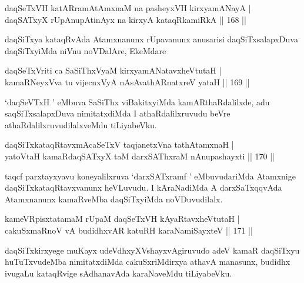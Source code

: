 \begin{shl}
daqSeTxVH katARramAtAmxnaM na pasheyxVH kirxyamANayA |\\
daqSATxyX rUpAnupAtinAyx na kirxyA kataqRkamiRkA \hfill || 168 ||
\end{shl}

\begin{artha}
daqSiTxya kataqRvAda Atamxnanunx rUpavanunx anusarisi daqSiTxsalapxDuva daqSiTxyiMda niVnu noVDalAre, EkeMdare
\end{artha}

\begin{shl}
daqSeTxVriti ca SaSiThxVyaM kirxyamANatavxheVtutaH |\\
kamaRNeyxVva tu vijecnxVyA nAsAvathARnatxreV yataH \hfill || 169 ||
\end{shl}

\begin{artha}
`daqSeVTxH ' eMbuva SaSiThx viBakitxyiMda kamARthaRdalilxde, adu saqSiTxsalapxDuva nimitatxdiMda I athaRdalilxruvudu beVre athaRdalilxruvudilalxveMdu tiLiyabeVku.
\end{artha}


\begin{shl}
daqSiTxkataqRtavxmAcaSeTxV taqjanetxVna tathA\s \s tamxnaH |\\
yatoV\s taH kamaRdaqSATxyX taM darxSAThxraM nAnupashayxti \hfill || 170 ||
\end{shl}

\begin{artha}
taqcf parxtayxyavu koneyalilxruva `darxSATxramf ' eMbuvudariMda Atamxnige daqSiTxkataqRtavxvanunx heVLuvudu. I kAraNadiMda A darxSaTxqqvAda Atamxnanunx kamaRveMba daqSiTxyiMda noVDuvudilalx.
\end{artha}


\begin{shl}
kameVRpisxtatamaM rUpaM daqSeTxVH kAyaRtavxheVtutaH |\\
cakuSxmaRnoV vA budidhxvAR katuRH karaNamiSayxteV \hfill || 171 ||
\end{shl}

\begin{artha}
daqSiTxkirxyege muKayx udeVdhxyXVshayxvAgiruvudo adeV kamaR daqSiTxyu huTuTxvudeMba nimitatxdiMda cakuSxriMdirxya athavA manasunx, budidhx ivugaLu kataqRvige sAdhanavAda karaNaveMdu tiLiyabeVku.
\end{artha}

